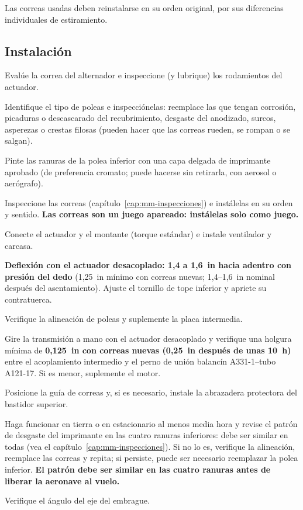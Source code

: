 \begin{precaucion}
Las correas usadas deben reinstalarse en su orden original, por sus diferencias individuales de estiramiento.
\end{precaucion}

\subsection{Instalación}

\begin{pasos}
\item Evalúe la correa del alternador e inspeccione (y lubrique) los rodamientos del actuador.
\item Identifique el tipo de poleas e inspecciónelas: reemplace las que tengan corrosión, picaduras o descascarado del recubrimiento, desgaste del anodizado, surcos, asperezas o crestas filosas (pueden hacer que las correas rueden, se rompan o se salgan).
\item Pinte las ranuras de la polea inferior con una capa delgada de imprimante aprobado (de preferencia cromato; puede hacerse sin retirarla, con aerosol o aerógrafo).
\item Inspeccione las correas (capítulo~\ref{cap:mm-inspecciones}) e instálelas en su orden y sentido. \textbf{Las correas son un juego apareado: instálelas solo como juego.}
\item Conecte el actuador y el montante (torque estándar) e instale ventilador y carcasa.
\item \textbf{Deflexión con el actuador desacoplado: 1,4 a 1,6~in hacia adentro con presión del dedo} (1,25~in mínimo con correas nuevas; 1,4--1,6~in nominal después del asentamiento). Ajuste el tornillo de tope inferior y apriete su contratuerca.
\item Verifique la alineación de poleas y suplemente la placa intermedia.
\item Gire la transmisión a mano con el actuador desacoplado y verifique una holgura mínima de \textbf{0,125~in con correas nuevas (0,25~in después de unas 10~h)} entre el acoplamiento intermedio y el perno de unión balancín A331-1--tubo A121-17. Si es menor, suplemente el motor.
\item Posicione la guía de correas y, si es necesario, instale la abrazadera protectora del bastidor superior.
\item Haga funcionar en tierra o en estacionario al menos media hora y revise el patrón de desgaste del imprimante en las cuatro ranuras inferiores: debe ser similar en todas (vea el capítulo~\ref{cap:mm-inspecciones}). Si no lo es, verifique la alineación, reemplace las correas y repita; si persiste, puede ser necesario reemplazar la polea inferior. \textbf{El patrón debe ser similar en las cuatro ranuras antes de liberar la aeronave al vuelo.}
\item Verifique el ángulo del eje del embrague.
\end{pasos}

